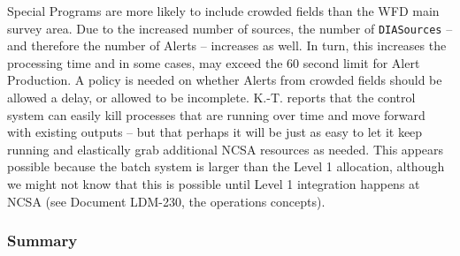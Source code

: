 \documentclass[DM,lsstdraft,toc]{lsstdoc}
\begin{document}
Special Programs are more likely to include crowded fields than the WFD main survey area. Due to the increased number of sources, the number of {\tt DIASources} -- and therefore the number of Alerts -- increases as well. In turn, this increases the processing time and in some cases, may exceed the 60 second limit for Alert Production. A policy is needed on whether Alerts from crowded fields should be allowed a delay, or allowed to be incomplete. K.-T. reports that the control system can easily kill processes that are running over time and move forward with existing outputs -- but that perhaps it will be just as easy to let it keep running and elastically grab additional NCSA resources as needed. This appears possible because the batch system is larger than the Level 1 allocation, although we might not know that this is possible until Level 1 integration happens at NCSA (see Document LDM-230, the operations concepts).

\subsubsection{Summary}
\end{document}
